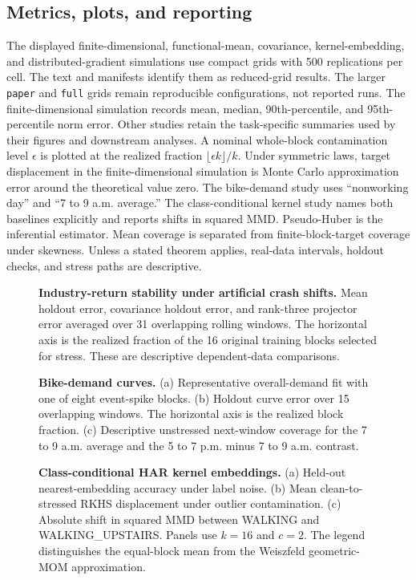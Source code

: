 \documentclass[twoside]{article}
\theoremstyle{definition}
\begin{document}
\subsection{Metrics, plots, and reporting}

The displayed finite-dimensional, functional-mean, covariance, kernel-embedding, and distributed-gradient simulations use compact grids with 500 replications per cell. The text and manifests identify them as reduced-grid results. The larger \texttt{paper} and \texttt{full} grids remain reproducible configurations, not reported runs. The finite-dimensional simulation records mean, median, 90th-percentile, and 95th-percentile norm error. Other studies retain the task-specific summaries used by their figures and downstream analyses. A nominal whole-block contamination level $\epsilon$ is plotted at the realized fraction $\lfloor\epsilon k\rfloor/k$. Under symmetric laws, target displacement in the finite-dimensional simulation is Monte Carlo approximation error around the theoretical value zero. The bike-demand study uses ``nonworking day'' and ``7 to 9 a.m. average.'' The class-conditional kernel study names both baselines explicitly and reports shifts in squared MMD. Pseudo-Huber is the inferential estimator. Mean coverage is separated from finite-block-target coverage under skewness. Unless a stated theorem applies, real-data intervals, holdout checks, and stress paths are descriptive.

\begin{figure}[p]
\centering
\resizebox{\textwidth}{!}{}
\caption{\textbf{Industry-return stability under artificial crash shifts.}
Mean holdout error, covariance holdout error, and rank-three projector error averaged over 31 overlapping rolling windows. The horizontal axis is the realized fraction of the 16 original training blocks selected for stress. These are descriptive dependent-data comparisons.}
\label{fig:industry-returns}
\end{figure}

\begin{figure}[p]
\centering
\resizebox{0.99\textwidth}{!}{}
\caption{\textbf{Bike-demand curves.}
(a) Representative overall-demand fit with one of eight event-spike blocks. (b) Holdout curve error over 15 overlapping windows. The horizontal axis is the realized block fraction. (c) Descriptive unstressed next-window coverage for the 7 to 9 a.m. average and the 5 to 7 p.m. minus 7 to 9 a.m. contrast.}
\label{fig:bike-demand}
\end{figure}

\begin{figure}[p]
\centering
\resizebox{0.99\textwidth}{!}{}
\caption{\textbf{Class-conditional HAR kernel embeddings.}
(a) Held-out nearest-embedding accuracy under label noise. (b) Mean clean-to-stressed RKHS displacement under outlier contamination. (c) Absolute shift in squared MMD between WALKING and WALKING\_UPSTAIRS. Panels use $k=16$ and $c=2$. The legend distinguishes the equal-block mean from the Weiszfeld geometric-MOM approximation.}
\label{fig:class-conditional-kernel}
\end{figure}
\end{document}
